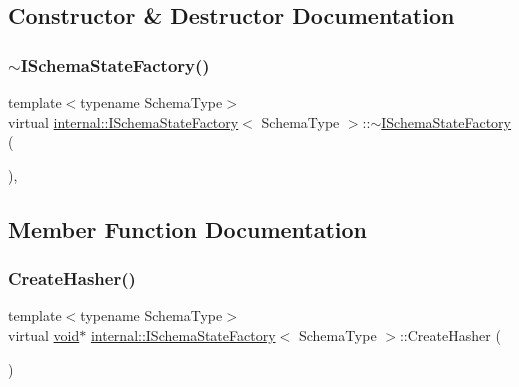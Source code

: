 \subsection{Constructor \& Destructor Documentation}
\mbox{\label{classinternal_1_1ISchemaStateFactory_ae769eac75f9561fc8d0da7fadad2f6b4}} 
\subsubsection{\texorpdfstring{$\sim$\+I\+Schema\+State\+Factory()}{~ISchemaStateFactory()}}
{\footnotesize\ttfamily template$<$typename Schema\+Type$>$ \\
virtual \hyperlink{classinternal_1_1ISchemaStateFactory}{internal\+::\+I\+Schema\+State\+Factory}$<$ Schema\+Type $>$\+::$\sim$\hyperlink{classinternal_1_1ISchemaStateFactory}{I\+Schema\+State\+Factory} (\begin{DoxyParamCaption}{ }\end{DoxyParamCaption})\hspace{0.3cm}{\ttfamily [inline]}, {\ttfamily [virtual]}}



\subsection{Member Function Documentation}
\mbox{\label{classinternal_1_1ISchemaStateFactory_a4ac37b9d3e9526004c82692473f978f4}} 
\subsubsection{\texorpdfstring{Create\+Hasher()}{CreateHasher()}}
{\footnotesize\ttfamily template$<$typename Schema\+Type$>$ \\
virtual \hyperlink{imgui__impl__opengl3__loader_8h_ac668e7cffd9e2e9cfee428b9b2f34fa7}{void}$\ast$ \hyperlink{classinternal_1_1ISchemaStateFactory}{internal\+::\+I\+Schema\+State\+Factory}$<$ Schema\+Type $>$\+::Create\+Hasher (\begin{DoxyParamCaption}{ }\end{DoxyParamCaption})\hspace{0.3cm}{\ttfamily [pure virtual]}}



